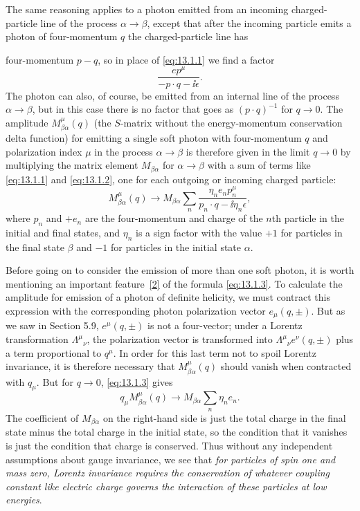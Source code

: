 The same reasoning applies to a photon emitted from an incoming
charged-particle line of the process $\alpha\to\beta$, except that after the incoming
particle emits a photon of four-momentum $q$ the charged-particle line has



four-momentum $p-q$, so in place of \eqref{eq:13.1.1} we find a factor
\begin{equation}
  \frac{e p^\mu}{-p\cdot q-\ii\epsilon}.
  \tag{13.1.2}\label{eq:13.1.2}
\end{equation}
The photon can also, of course, be emitted from an internal line of the
process $\alpha\to\beta$, but in this case there is no factor that goes as $(p\cdot q)^{-1}$
for $q\to0$. The amplitude $M^\mu_{\beta\alpha}(q)$ (the $S$-matrix without the
energy-momentum conservation delta function) for emitting a single soft photon
with four-momentum $q$ and polarization index $\mu$ in the process $\alpha\to\beta$ is
therefore given in the limit $q\to0$ by multiplying the matrix element $M_{\beta\alpha}$
for $\alpha\to\beta$ with a sum of terms like \eqref{eq:13.1.1} and
\eqref{eq:13.1.2}, one for each
outgoing or incoming charged particle:
\begin{equation}
  M^\mu_{\beta\alpha}(q)\longrightarrow
  M_{\beta\alpha}\sum_n\frac{\eta_n e_n p_n^\mu}{p_n\cdot q-\ii\eta_n\epsilon},
  \tag{13.1.3}\label{eq:13.1.3}
\end{equation}
where $p_n$ and $+e_n$ are the four-momentum and charge of the $n$th particle
in the initial and final states, and $\eta_n$ is a sign factor with the value $+1$ for
particles in the final state $\beta$ and $-1$ for particles in the initial state $\alpha$.

Before going on to consider the emission of more than one soft photon,
it is worth mentioning an important feature~\hyperref[ref:13.2]{[2]} of the formula
\eqref{eq:13.1.3}. To
calculate the amplitude for emission of a photon of definite helicity, we
must contract this expression with the corresponding photon polarization
vector $e_\mu(q,\pm)$. But as we saw in Section 5.9, $e^\mu(q,\pm)$ is not a four-vector;
under a Lorentz transformation $\Lambda^\mu{}_{\nu}$, the polarization vector is transformed
into $\Lambda^\mu{}_{\nu}e^\nu(q,\pm)$ plus a term proportional to $q^\mu$. In order for this last term
not to spoil Lorentz invariance, it is therefore necessary that $M^\mu_{\beta\alpha}(q)$ should
vanish when contracted with $q_\mu$. But for $q\to0$, \eqref{eq:13.1.3} gives
\begin{equation}
  q_\mu M^\mu_{\beta\alpha}(q)\longrightarrow M_{\beta\alpha}\sum_n\eta_n e_n.
  \tag{13.1.4}\label{eq:13.1.4}
\end{equation}
The coefficient of $M_{\beta\alpha}$ on the right-hand side is just the total charge in the
final state minus the total charge in the initial state, so the condition that
it vanishes is just the condition that charge is conserved. Thus without any
independent assumptions about gauge invariance, we see that \emph{for particles
of spin one and mass zero, Lorentz invariance requires the conservation of
whatever coupling constant like electric charge governs the interaction of
these particles at low energies}.

